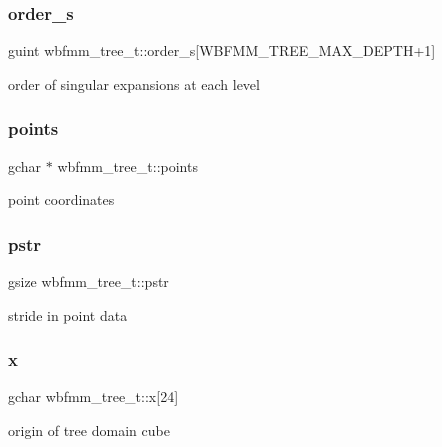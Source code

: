 \subsubsection{order\+\_\+s}
{\footnotesize\ttfamily guint wbfmm\+\_\+tree\+\_\+t\+::order\+\_\+s[W\+B\+F\+M\+M\+\_\+\+T\+R\+E\+E\+\_\+\+M\+A\+X\+\_\+\+D\+E\+P\+TH+1]}

order of singular expansions at each level \mbox{\label{structwbfmm__tree__t_a82a6af6a6d054522a860e1a536f6a105}} 
\subsubsection{points}
{\footnotesize\ttfamily gchar $\ast$ wbfmm\+\_\+tree\+\_\+t\+::points}

point coordinates \mbox{\label{structwbfmm__tree__t_a96d1d01546cca1baf4a6a8c953ad1252}} 
\subsubsection{pstr}
{\footnotesize\ttfamily gsize wbfmm\+\_\+tree\+\_\+t\+::pstr}

stride in point data \mbox{\label{structwbfmm__tree__t_a44e44f2c0eabe36743d1f975b0d0798c}} 
\subsubsection{x}
{\footnotesize\ttfamily gchar wbfmm\+\_\+tree\+\_\+t\+::x[24]}

origin of tree domain cube 